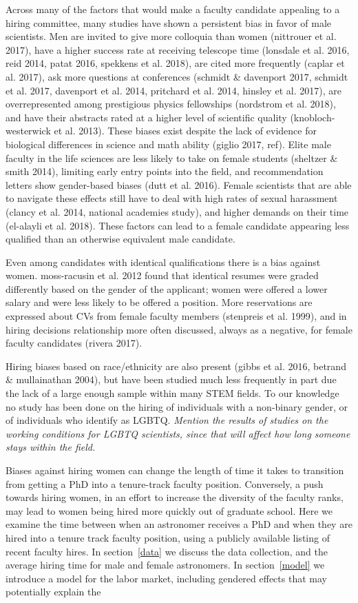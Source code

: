 \documentclass[modern]{aastex62}
\begin{document}
Across many of the factors that would make a faculty candidate appealing to a hiring committee, many studies have shown a persistent bias in favor of male scientists. Men are invited to give more colloquia than women (nittrouer et al. 2017), have a higher success rate at receiving telescope time (lonsdale et al. 2016, reid 2014, patat 2016, spekkens et al. 2018), are cited more frequently (caplar et al. 2017), ask more questions at conferences (schmidt \& davenport 2017, schmidt et al. 2017, davenport et al. 2014, pritchard et al. 2014, hinsley et al. 2017), are overrepresented among prestigious physics fellowships (nordstrom et al. 2018), and have their abstracts rated at a higher level of scientific quality (knobloch-westerwick et al. 2013). These biases exist despite the lack of evidence for biological differences in science and math ability (giglio 2017, ref). Elite male faculty in the life sciences are less likely to take on female students (sheltzer \& smith 2014), limiting early entry points into the field, and recommendation letters show gender-based biases (dutt et al. 2016).  Female scientists that are able to navigate these effects still have to deal with high rates of sexual harassment (clancy et al. 2014, national academies study), and higher demands on their time (el-alayli et al. 2018). These factors can lead to a female candidate appearing less qualified than an otherwise equivalent male candidate. 

Even among candidates with identical qualifications there is a bias against women. moss-racusin et al. 2012 found that identical resumes were graded differently based on the gender of the applicant; women were offered a lower salary and were less likely to be offered a position. More reservations are expressed about CVs from female faculty members (stenpreis et al. 1999), and in hiring decisions relationship more often discussed, always as a negative, for female faculty candidates (rivera 2017). 

Hiring biases based on race/ethnicity are also present (gibbs et al. 2016, betrand \& mullainathan 2004), but have been studied much less frequently in part due the lack of a large enough sample within many STEM fields. To our knowledge no study has been done on the hiring of individuals with a non-binary gender, or of individuals who identify as LGBTQ. {\it Mention the results of studies on the working conditions for LGBTQ scientists, since that will affect how long someone stays within the field.}

Biases against hiring women can change the length of time it takes to transition from getting a PhD into a tenure-track faculty position. Conversely, a push towards hiring women, in an effort to increase the diversity of the faculty ranks, may lead to women being hired more quickly out of graduate school. Here we examine the time between when an astronomer receives a PhD and when they are hired into a tenure track faculty position, using a publicly available listing of recent faculty hires. In section~\ref{data} we discuss the data collection, and the average hiring time for male and female astronomers. In section~\ref{model} we introduce a model for the labor market, including gendered effects that may potentially explain the 
\end{document}
